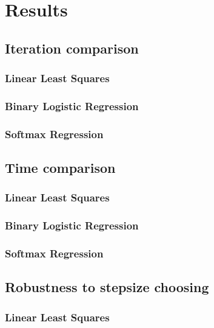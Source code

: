 \documentclass{article}
\begin{document}

\section{Results}
\subsection{Iteration comparison}

\subsubsection{Linear Least Squares}
\subsubsection{Binary Logistic Regression}
\subsubsection{Softmax Regression}

\subsection{Time comparison}

\subsubsection{Linear Least Squares}
\subsubsection{Binary Logistic Regression}
\subsubsection{Softmax Regression}

\subsection{Robustness to stepsize choosing}

\subsubsection{Linear Least Squares}
\end{document}
